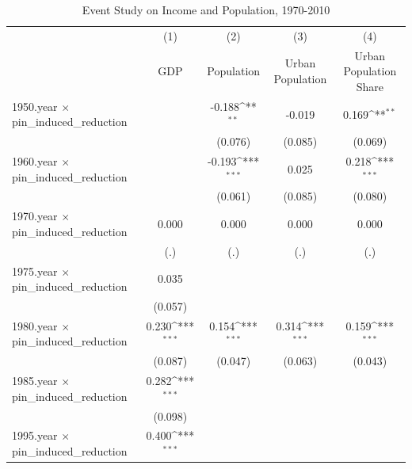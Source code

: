 \begin{table}[htbp]\centering
\def\sym#1{\ifmmode^{#1}\else\(^{#1}\)\fi}
\caption{Event Study on Income and Population, 1970-2010}
\begin{tabular}{l*{4}{c}}
\hline\hline
                    &\multicolumn{1}{c}{(1)}         &\multicolumn{1}{c}{(2)}         &\multicolumn{1}{c}{(3)}         &\multicolumn{1}{c}{(4)}         \\
                    &         GDP         &  Population         &Urban Population         &Urban Population Share         \\
\hline
1950.year $\times$ pin\_induced\_reduction&                     &      -0.188\sym{**} &      -0.019         &       0.169\sym{**} \\
                    &                     &     (0.076)         &     (0.085)         &     (0.069)         \\
1960.year $\times$ pin\_induced\_reduction&                     &      -0.193\sym{***}&       0.025         &       0.218\sym{***}\\
                    &                     &     (0.061)         &     (0.085)         &     (0.080)         \\
1970.year $\times$ pin\_induced\_reduction&       0.000         &       0.000         &       0.000         &       0.000         \\
                    &         (.)         &         (.)         &         (.)         &         (.)         \\
1975.year $\times$ pin\_induced\_reduction&       0.035         &                     &                     &                     \\
                    &     (0.057)         &                     &                     &                     \\
1980.year $\times$ pin\_induced\_reduction&       0.230\sym{***}&       0.154\sym{***}&       0.314\sym{***}&       0.159\sym{***}\\
                    &     (0.087)         &     (0.047)         &     (0.063)         &     (0.043)         \\
1985.year $\times$ pin\_induced\_reduction&       0.282\sym{***}&                     &                     &                     \\
                    &     (0.098)         &                     &                     &                     \\
1995.year $\times$ pin\_induced\_reduction&       0.400\sym{***}&                     &                     &                     \\

\end{tabular}
\end{table}
